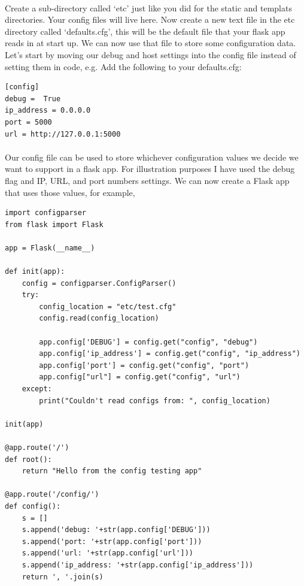 \documentclass[12pt, a4paper, oneside]{book}
\begin{document}
{\paragraph{} Create a sub-directory called `etc' just like you did for the static and templats directories. Your config files will live here. Now create a new text file in the etc directory called `defaults.cfg', this will be the default file that your flask app reads in at start up. We can now use that file to store some configuration data. Let's start by moving our debug and host settings into the config file instead of setting them in code, e.g. Add the following to your defaults.cfg:

\begin{lstlisting}
[config]
debug =  True
ip_address = 0.0.0.0
port = 5000
url = http://127.0.0.1:5000
\end{lstlisting}

\paragraph{} Our config file can be used to store whichever configuration values we decide we want to support in a flask app. For illustration purposes I have used the debug flag and IP, URL, and port numbers settings. We can now create a Flask app that uses those values, for example,

\begin{lstlisting}
import configparser
from flask import Flask

app = Flask(__name__)

def init(app):
    config = configparser.ConfigParser()
    try:
        config_location = "etc/test.cfg"
        config.read(config_location)

        app.config['DEBUG'] = config.get("config", "debug")
        app.config['ip_address'] = config.get("config", "ip_address")
        app.config['port'] = config.get("config", "port")
        app.config["url"] = config.get("config", "url")
    except:
        print("Couldn't read configs from: ", config_location)

init(app)

@app.route('/')
def root():
    return "Hello from the config testing app"

@app.route('/config/')
def config():
    s = []
    s.append('debug: '+str(app.config['DEBUG']))
    s.append('port: '+str(app.config['port']))
    s.append('url: '+str(app.config['url']))
    s.append('ip_address: '+str(app.config['ip_address']))
    return ', '.join(s)


\end{lstlisting}}
\end{document}
